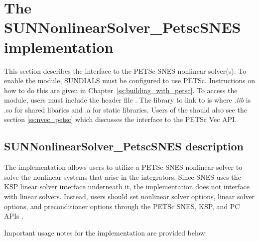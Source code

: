\section{The SUNNonlinearSolver\_PetscSNES implementation}
\label{s:sunnonlinsolpetsc}
This section describes the {\sunnonlinsol} interface to the PETSc SNES nonlinear
solver(s). To enable the {\sunnonlinsolpetsc} module, SUNDIALS must be
configured to use PETSc. Instructions on how to do this are given in
Chapter~\ref{ss:building_with_petsc}. To access the module, users must include
the header file . The library to link
to is  where {\em .lib} is .so for
shared libaries and .a for static libraries. Users of the {\sunnonlinsolpetsc}
should also see the section {\nvecpetsc} \ref{ss:nvec_petsc} which discusses the
{\nvector} interface to the PETSc Vec API.

\subsection{SUNNonlinearSolver\_PetscSNES description}
\label{ss:sunnonlinsolpetsc_description}

The {\sunnonlinsolpetsc} implementation allows users to utilize a PETSc SNES
nonlinear solver to solve the nonlinear systems that arise in the {\sundials}
integrators. Since SNES uses the KSP linear solver interface underneath it, the
{\sunnonlinsolpetsc} implementation does not interface with {\sundials} linear
solvers. Instead, users should set nonlinear solver options, linear solver
options, and preconditioner options through the PETSc SNES, KSP, and PC APIs
\cite{petsc-user-ref}.

{\warn}

Important usage notes for the {\sunnonlinsolpetsc} implementation are provided
below:

